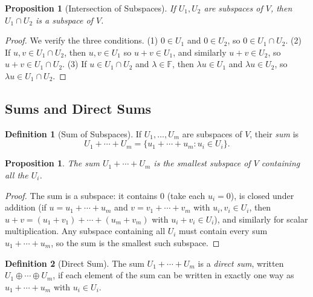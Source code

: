 \documentclass[11pt,a4paper]{article}
\theoremstyle{definition}
\newtheorem{definition}{Definition}[section]
\theoremstyle{plain}
\newtheorem{proposition}[theorem]{Proposition}
\theoremstyle{remark}
\newcommand{\F}{\mathbb{F}}
\begin{document}
\begin{proposition}[Intersection of Subspaces]
\label{prop:intersection_subspaces}
If $U_1, U_2$ are subspaces of $V$, then $U_1 \cap U_2$ is a subspace of $V$.
\end{proposition}

\begin{proof}
We verify the three conditions. (1) $0 \in U_1$ and $0 \in U_2$, so $0 \in U_1 \cap U_2$.
(2) If $u, v \in U_1 \cap U_2$, then $u, v \in U_1$ so $u + v \in U_1$, and similarly
$u + v \in U_2$, so $u + v \in U_1 \cap U_2$. (3) If $u \in U_1 \cap U_2$ and $\lambda \in \F$,
then $\lambda u \in U_1$ and $\lambda u \in U_2$, so $\lambda u \in U_1 \cap U_2$.
\end{proof}

\subsection{Sums and Direct Sums}
\label{subsec:sums}

\begin{definition}[Sum of Subspaces]
\label{def:sum_subspaces}
If $U_1, \ldots, U_m$ are subspaces of $V$, their \emph{sum} is
\[
    U_1 + \cdots + U_m = \{u_1 + \cdots + u_m : u_i \in U_i\}.
\]
\end{definition}

\begin{proposition}
\label{prop:sum_is_subspace}
The sum $U_1 + \cdots + U_m$ is the smallest subspace of $V$ containing all the $U_i$.
\end{proposition}

\begin{proof}
The sum is a subspace: it contains $0$ (take each $u_i = 0$), is closed under addition
(if $u = u_1 + \cdots + u_m$ and $v = v_1 + \cdots + v_m$ with $u_i, v_i \in U_i$,
then $u + v = (u_1 + v_1) + \cdots + (u_m + v_m)$ with $u_i + v_i \in U_i$), and
similarly for scalar multiplication. Any subspace containing all $U_i$ must contain
every sum $u_1 + \cdots + u_m$, so the sum is the smallest such subspace.
\end{proof}

\begin{definition}[Direct Sum]
\label{def:direct_sum}
The sum $U_1 + \cdots + U_m$ is a \emph{direct sum}, written
$U_1 \oplus \cdots \oplus U_m$, if each element of the sum can be written
in exactly one way as $u_1 + \cdots + u_m$ with $u_i \in U_i$.
\end{definition}
\end{document}
